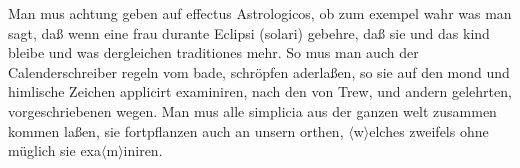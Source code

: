 \pend%
\pstart%
Man mus achtung geben auf effectus Astrologicos, ob zum exempel wahr was man sagt, da{\ss} wenn eine frau durante Eclipsi (solari)\protect{} gebehre, da{\ss} sie und das kind bleibe und was dergleichen traditiones mehr.
\pend%
\pstart%
So mus man auch der Calenderschreiber regeln vom bade, schr\"{o}pfen\protect{} aderla{\ss}en,\protect{}
so sie auf den mond\protect{} und himlische Zeichen applicirt examiniren, nach den von
Trew,\protect{}
und andern gelehrten, vorgeschriebenen wegen.
\pend%
\pstart%
Man mus alle simplicia aus der ganzen welt zusammen kommen la{\ss}en, sie fortpflan\-zen auch an unsern orthen, $\langle$w$\rangle$elches zweifels ohne m\"{u}glich sie exa$\langle$m$\rangle$iniren.%

